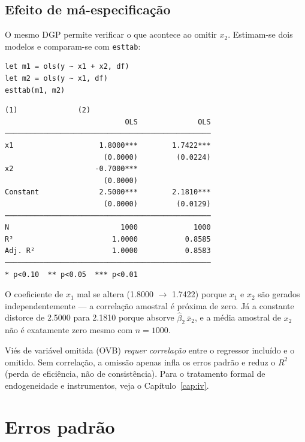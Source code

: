 \subsection*{Efeito de má-especificação}

O mesmo DGP permite verificar o que acontece ao omitir $x_2$.
Estimam-se dois modelos e comparam-se com \lstinline{esttab}:

\begin{lstlisting}[caption={Modelo correto vs.\ $x_2$ omitido}]
let m1 = ols(y ~ x1 + x2, df)
let m2 = ols(y ~ x1, df)
esttab(m1, m2)
\end{lstlisting}

\begin{lstlisting}[language={}, basicstyle=\ttfamily\small,
  frame=none, numbers=none, backgroundcolor=\color{codbg},
  xleftmargin=0pt, xrightmargin=0pt, breaklines=false]
                            (1)              (2)
                            OLS              OLS
────────────────────────────────────────────────
x1                    1.8000***        1.7422***
                       (0.0000)         (0.0224)
x2                   -0.7000***
                       (0.0000)
Constant              2.5000***        2.1810***
                       (0.0000)         (0.0129)
────────────────────────────────────────────────
N                          1000             1000
R²                       1.0000           0.8585
Adj. R²                  1.0000           0.8583
────────────────────────────────────────────────
* p<0.10  ** p<0.05  *** p<0.01
\end{lstlisting}

\noindent O coeficiente de $x_1$ mal se altera (1.8000 $\to$ 1.7422) porque
$x_1$ e $x_2$ são gerados independentemente — a correlação amostral é
próxima de zero. Já a constante distorce de 2.5000 para 2.1810 porque
absorve $\hat\beta_2\,\bar{x}_2$, e a média amostral de $x_2$ não é
exatamente zero mesmo com $n=1000$.

\begin{nota}
  Viés de variável omitida (OVB) \emph{requer correlação} entre o regressor
  incluído e o omitido. Sem correlação, a omissão apenas infla os erros
  padrão e reduz o $R^2$ (perda de eficiência, não de consistência). Para o
  tratamento formal de endogeneidade e instrumentos, veja o
  Capítulo~\ref{cap:iv}.
\end{nota}

\section{Erros padrão}

